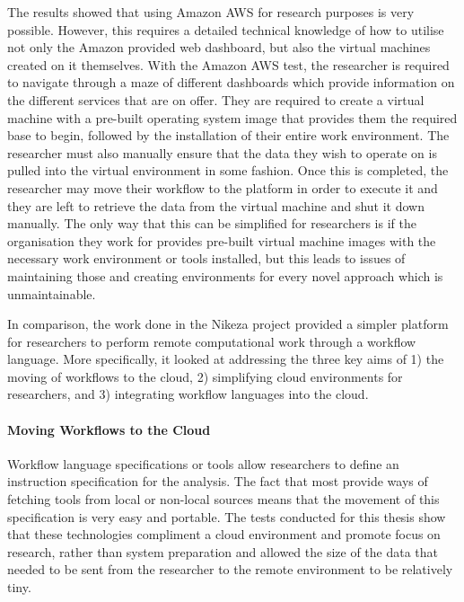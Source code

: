 The results showed that using Amazon AWS for research purposes is very possible. However, this requires a detailed technical knowledge of how to utilise not only the Amazon provided web dashboard, but also the virtual machines created on it themselves. With the Amazon AWS test, the researcher is required to navigate through a maze of different dashboards which provide information on the different services that are on offer. They are required to create a virtual machine with a pre-built operating system image that provides them the required base to begin, followed by the installation of their entire work environment. The researcher must also manually ensure that the data they wish to operate on is pulled into the virtual environment in some fashion. Once this is completed, the researcher may move their workflow to the platform in order to execute it and they are left to retrieve the data from the virtual machine and shut it down manually. The only way that this can be simplified for researchers is if the organisation they work for provides pre-built virtual machine images with the necessary work environment or tools installed, but this leads to issues of maintaining those and creating environments for every novel approach which is unmaintainable.

In comparison, the work done in the Nikeza project provided a simpler platform for researchers to perform remote computational work through a workflow language. More specifically, it looked at addressing the three key aims of 1) the moving of workflows to the cloud, 2) simplifying cloud environments for researchers, and 3) integrating workflow languages into the cloud.

\paragraph{Moving Workflows to the Cloud}
Workflow language specifications or tools allow researchers to define an instruction specification for the analysis. The fact that most provide ways of fetching tools from local or non-local sources means that the movement of this specification is very easy and portable. The tests conducted for this thesis show that these technologies compliment a cloud environment and promote focus on research, rather than system preparation and allowed the size of the data that needed to be sent from the researcher to the remote environment to be relatively tiny.

